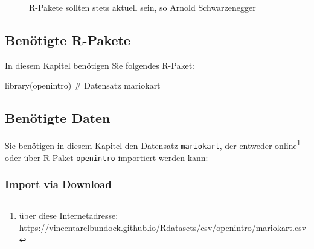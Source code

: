 \documentclass[
  a4paper,
  DIV=11]{scrreprt}
\newenvironment{Shaded}{\begin{snugshade}}{\end{snugshade}}
\newcommand{\CommentTok}[1]{\textcolor[rgb]{0.37,0.37,0.37}{#1}}
\newcommand{\FunctionTok}[1]{\textcolor[rgb]{0.28,0.35,0.67}{#1}}
\newcommand{\NormalTok}[1]{\textcolor[rgb]{0.00,0.23,0.31}{#1}}
\theoremstyle{definition}
\theoremstyle{definition}
\theoremstyle{definition}
\theoremstyle{remark}
\begin{document}

\begin{figure}


\caption{\label{fig-arnie}R-Pakete sollten stets aktuell sein, so Arnold
Schwarzenegger}

\end{figure}%

\subsection{Benötigte R-Pakete}\label{benuxf6tigte-r-pakete}

In diesem Kapitel benötigen Sie folgendes R-Paket:

\begin{Shaded}
\begin{Highlighting}[]
\FunctionTok{library}\NormalTok{(openintro)  }\CommentTok{\# Datensatz \textasciigrave{}mariokart\textasciigrave{}}
\end{Highlighting}
\end{Shaded}

\subsection{Benötigte Daten}\label{benuxf6tigte-daten}

Sie benötigen in diesem Kapitel den Datensatz \texttt{mariokart}, der
entweder online\footnote{ über diese Internetadresse:
  \url{https://vincentarelbundock.github.io/Rdatasets/csv/openintro/mariokart.csv}}
oder über R-Paket \texttt{openintro} importiert werden kann:

\subsubsection{Import via Download}\label{import-via-download}
\end{document}
